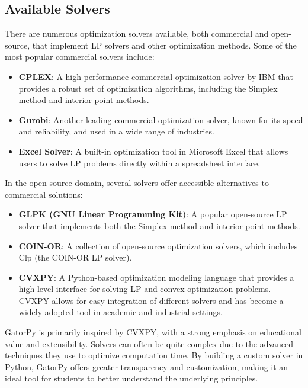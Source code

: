 \documentclass[conference]{IEEEtran}
\begin{document}
\subsection{Available Solvers}

There are numerous optimization solvers available, both commercial and open-source, that implement LP solvers and other optimization methods. 
Some of the most popular commercial solvers include:
\begin{itemize}
    \item \textbf{CPLEX}: A high-performance commercial optimization solver by IBM that provides a robust set of optimization algorithms, including the Simplex method and interior-point methods.
    \item \textbf{Gurobi}: Another leading commercial optimization solver, known for its speed and reliability, and used in a wide range of industries.
    \item \textbf{Excel Solver}: A built-in optimization tool in Microsoft Excel that allows users to solve LP problems directly within a spreadsheet interface. 
\end{itemize}

In the open-source domain, several solvers offer accessible alternatives to commercial solutions:
\begin{itemize}
    \item \textbf{GLPK (GNU Linear Programming Kit)}: A popular open-source LP solver that implements both the Simplex method and interior-point methods.
    \item \textbf{COIN-OR}: A collection of open-source optimization solvers, which includes Clp (the COIN-OR LP solver).
    \item \textbf{CVXPY}: A Python-based optimization modeling language that provides a high-level interface for solving LP and convex optimization problems. 
    CVXPY allows for easy integration of different solvers and has become a widely adopted tool in academic and industrial settings.
\end{itemize}

GatorPy is primarily inspired by CVXPY, with a strong emphasis on educational value and extensibility. 
Solvers can often be quite complex due to the advanced techniques they use to optimize computation time. 
By building a custom solver in Python, GatorPy offers greater transparency and customization, making it an ideal tool for students to better understand the underlying principles.
\end{document}
